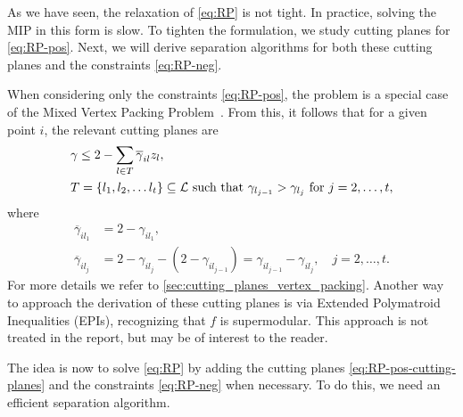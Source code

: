 As we have seen, the relaxation of \eqref{eq:RP} is not tight.
In practice, solving the MIP in this form is slow.
To tighten the formulation, we study cutting planes for \eqref{eq:RP-pos}.
Next, we will derive separation algorithms for both these cutting planes and the constraints \eqref{eq:RP-neg}.

When considering only the constraints \eqref{eq:RP-pos},
the problem is a special case of the Mixed Vertex Packing Problem~\cite{atamturk_mixed_2000}.
From this, it follows that for a given point $i$, the relevant cutting planes are
\begin{equation}\label{eq:RP-pos-cutting-planes}
\begin{split}
    &\gamma \leq 2 - \sum_{l\in T}\overline{\gamma}_{il}z_l, \quad \\
    &T = \{l_1, l_2, \dots l_t\} \subseteq \mathcal{L} \text{ such that } \gamma_{l_{j-1}} > \gamma_{l_{j}} \text { for } j = 2, \dots, t,
\end{split}
\end{equation}
where
\begin{align*}
    \overline\gamma_{il_1} &= 2 - \gamma_{il_1}, \\
    \overline\gamma_{il_j} &= 2 - \gamma_{il_j} - (2 - \gamma_{il_{j-1}}) = \gamma_{il_{j-1}} - \gamma_{il_j}, \quad j = 2, \dots, t.
\end{align*}
For more details we refer to \autoref{sec:cutting_planes_vertex_packing}.
Another way to approach the derivation of these cutting planes is via Extended Polymatroid Inequalities (EPIs),
recognizing that $f$ is supermodular.
\cite{kucukyavuz_mixed-integer_2023, atamturk_submodular_2020, lovasz_submodular_1983}
This approach is not treated in the report, but may be of interest to the reader.

The idea is now to solve \eqref{eq:RP} by adding the cutting planes \eqref{eq:RP-pos-cutting-planes} and the constraints
\eqref{eq:RP-neg} when necessary.
To do this, we need an efficient separation algorithm.
